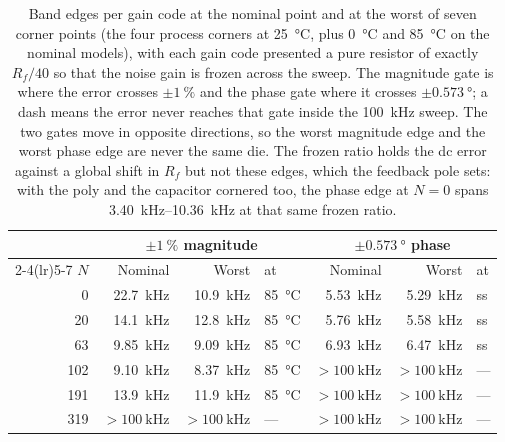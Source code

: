\begin{table}[htbp]
  \centering
  \caption[{Band edges per gain code, nominal and worst corner.}]{Band edges per
  gain code at the nominal point and at the worst of seven corner points (the
  four process corners at \SI{25}{\celsius}, plus \SI{0}{\celsius} and
  \SI{85}{\celsius} on the nominal models), with each gain code presented a
  pure resistor of exactly \(R_f/40\) so that the noise gain is frozen across the
  sweep. The magnitude gate is where the error crosses \(\pm\SI{1}{\percent}\)
  and the phase gate where it crosses \(\pm\SI{0.573}{\degree}\); a dash means
  the error never reaches that gate inside the \SI{100}{\kilo\hertz} sweep. The
  two gates move in opposite directions, so the worst magnitude edge and the
  worst phase edge are never the same die. The frozen ratio holds the dc error
  against a global shift in \(R_f\) but not these edges, which the feedback pole
  sets: with the poly and the capacitor cornered too, the phase edge at
  \(N = 0\) spans \SIrange{3.40}{10.36}{\kilo\hertz} at that same frozen ratio.}
  \label{tab:eis-band-corner}
  \begin{tabular}{rrrlrrl}
    \toprule
    & \multicolumn{3}{c}{\(\pm\SI{1}{\percent}\) magnitude} &
      \multicolumn{3}{c}{\(\pm\SI{0.573}{\degree}\) phase} \\
    \cmidrule(lr){2-4}\cmidrule(lr){5-7}
    $N$ & Nominal & Worst & at & Nominal & Worst & at \\
    \midrule
    0   & \SI{22.7}{\kilo\hertz} & \SI{10.9}{\kilo\hertz} & \SI{85}{\celsius} & \SI{5.53}{\kilo\hertz} & \SI{5.29}{\kilo\hertz} & ss \\
    20  & \SI{14.1}{\kilo\hertz} & \SI{12.8}{\kilo\hertz} & \SI{85}{\celsius} & \SI{5.76}{\kilo\hertz} & \SI{5.58}{\kilo\hertz} & ss \\
    63  & \SI{9.85}{\kilo\hertz} & \SI{9.09}{\kilo\hertz} & \SI{85}{\celsius} & \SI{6.93}{\kilo\hertz} & \SI{6.47}{\kilo\hertz} & ss \\
    102 & \SI{9.10}{\kilo\hertz} & \SI{8.37}{\kilo\hertz} & \SI{85}{\celsius} & \(>\SI{100}{\kilo\hertz}\) & \(>\SI{100}{\kilo\hertz}\) & --- \\
    191 & \SI{13.9}{\kilo\hertz} & \SI{11.9}{\kilo\hertz} & \SI{85}{\celsius} & \(>\SI{100}{\kilo\hertz}\) & \(>\SI{100}{\kilo\hertz}\) & --- \\
    319 & \(>\SI{100}{\kilo\hertz}\) & \(>\SI{100}{\kilo\hertz}\) & --- & \(>\SI{100}{\kilo\hertz}\) & \(>\SI{100}{\kilo\hertz}\) & --- \\
    \bottomrule
  \end{tabular}
\end{table}
